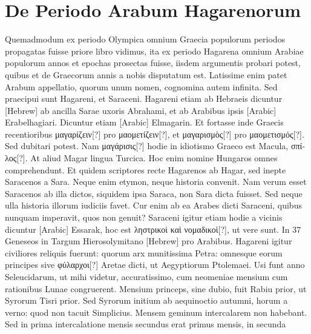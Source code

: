 \section{De Periodo Arabum Hagarenorum}
%
\begin{table}[htbp]
  
\end{table}
%
Quemadmodum
ex periodo Olympica
omnium Graecia
populorum periodos
propagatas fuisse priore libro
vidimus, ita ex periodo
Hagarena omnium
Arabiae populorum annos
et epochas prosectas
fuisse, iisdem argumentis
probari potest, quibus et
de Graecorum annis a nobis
disputatum est. Latissime
enim patet Arabum
appellatio, quorum unum
nomen, cognomina autem
infinita.
Sed praecipui
sunt Hagareni, et Saraceni.
Hagareni etiam ab
Hebraeis dicuntur \texthebrew{[Hebrew]} ab ancilla Sarae uxoris Abrahami,
 et ab Arabibus
ipsis \textarabic{[Arabic]} Erabelhagiari.
%
Dicuntur etiam \textarabic{[Arabic]}
Elmagarin.
Et fortasse inde Graecis recentioribus \textgreek{μαγαρίζειν[?]}
 pro \textgreek{μαομετίζειν[?]},
et \textgreek{μαγαρισμὸς[?]} pro \textgreek{μαομετισμός[?]}.
Sed dubitari potest.
Nam
\textgreek{μαγάρισις[?]} hodie in idiotismo Graeco est Macula,
 \textgreek{σπίλος[?]}.
At aliud
Magar lingua Turcica.
Hoc enim nomine Hungaros omnes comprehendunt.
Et quidem scriptores recte Hagarenos ab Hagar, sed inepte
Saracenos a Sara.
Neque enim etymon, neque historia convenit.
Nam verum esset Saracenos ab illa dictos, siquidem ipsa Saraca, non
Sara dicta fuisset.
Sed neque ulla historia illorum iudiciis favet.
Cur
enim ab ea Arabes dicti Saraceni, quibus nunquam imperavit, quos
non genuit?
Saraceni igitur etiam hodie a vicinis dicuntur \textarabic{[Arabic]}
Essarak, hoc est \textgreek{ληστρικοὶ καὶ νομαδικοὶ[?]}, ut vere sunt.
In 37 Geneseos in
Targum Hierosolymitano \texthebrew{[Hebrew]} pro Arabibus.
Hagareni igitur civiliores
reliquis fuerunt: quorum arx munitissima Petra: omnesque eorum
principes sive \textgreek{φύλαρχοι[?]} Aretae dicti, ut Aegyptiorum Ptolemaei.
Usi
funt anno Seleucidarum, ut mihi videtur, accuratissimo, cum neomeniae
mensium cum rationibus Lunae congruerent.
Mensium princeps,
sine dubio, fuit Rabiu prior, ut Syrorum Tisri prior.
Sed
Syrorum initium ab aequinoctio autumni, horum a verno: quod non tacuit
Simplicius.
Mensem geminum intercalarem non habebant.
Sed in
prima intercalatione mensis secundus erat primus mensis, in secunda
